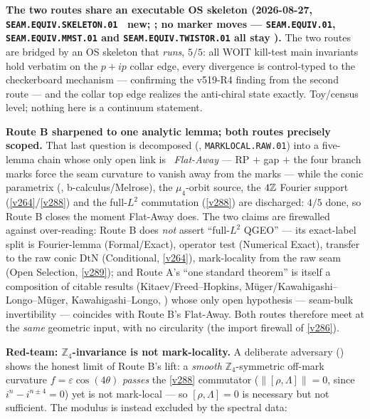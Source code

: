 \par\smallskip\noindent\textbf{The two routes share an executable OS skeleton (2026-08-27,
\texttt{SEAM.EQUIV.SKELETON.01} \mE\ new; ; no marker
moves --- \texttt{SEAM.EQUIV.01}, \texttt{SEAM.EQUIV.MMST.01} and
\texttt{SEAM.EQUIV.TWISTOR.01} all stay \mO).} The two routes are bridged by an OS skeleton
that \emph{runs}, $5/5$: all WOIT kill-test main invariants hold verbatim on the $p{+}ip$
collar edge, every divergence is control-typed to the checkerboard mechanism --- confirming
the v519-R4 finding from the second route --- and the collar top edge realizes the
anti-chiral state exactly. Toy/census level; nothing here is a continuum statement.
\par\smallskip\noindent\textbf{Route B sharpened to one analytic lemma; both routes precisely scoped.}
That last question is decomposed (, \texttt{MARKLOCAL.RAW.01}) into a five-lemma
chain whose only open link is \mO\ \emph{Flat-Away} --- RP $+$ gap $+$ the four branch marks force the seam
curvature to vanish away from the marks --- while the conic parametrix (\mC, b-calculus/Melrose), the
$\mu_4$-orbit source, the $4\mathbb Z$ Fourier support (\vref{v264}/\vref{v288}) and the full-$L^2$ commutation
(\vref{v288}) are discharged: $4/5$ done, so Route B closes the moment Flat-Away does. The two claims are
firewalled against over-reading: Route B does \emph{not} assert ``full-$L^2$ QGEO'' --- its exact-label split is
Fourier-lemma (Formal/Exact), operator test (Numerical Exact), transfer to the raw conic DtN (Conditional,
\vref{v264}), mark-locality from the raw seam (Open Selection, \vref{v289}); and Route A's ``one standard
theorem'' is itself a composition of citable results (Kitaev/Freed--Hopkins, M\"uger/Kawahigashi--Longo--M\"uger,
Kawahigashi--Longo, ) whose only open hypothesis ---
seam-bulk invertibility --- coincides with Route B's Flat-Away. Both routes therefore meet at the \emph{same}
geometric input, with no circularity (the import firewall of \vref{v286}).
\par\smallskip\noindent\textbf{Red-team: $\mathbb{Z}_4$-invariance is not mark-locality.} A deliberate
adversary () shows the honest limit of Route B's lift: a
\emph{smooth} $\mathbb{Z}_4$-symmetric off-mark curvature $f=\varepsilon\cos(4\theta)$ \emph{passes} the
\vref{v288} commutator ($\|[\rho,\Lambda]\|=0$, since $i^n-i^{n\pm4}=0$) yet is not mark-local --- so
$[\rho,\Lambda]{=}0$ is necessary but not sufficient. The modulus is instead excluded by the spectral data:
